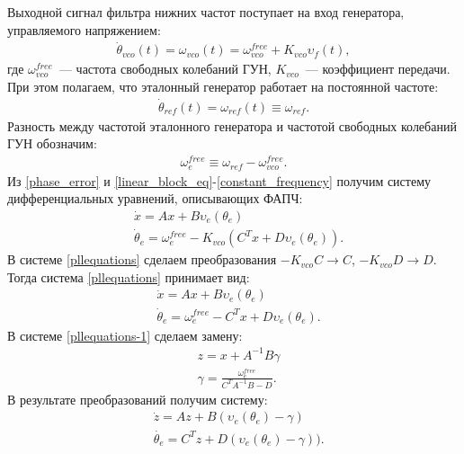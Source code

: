 \documentclass[a4paper,article,14pt]{extarticle}
\begin{document}
Выходной сигнал фильтра нижних частот поступает на вход генератора, управляемого напряжением:
 \begin{equation}\label{VCO_eq}
 \begin{aligned}
\dot{\theta}_{vco}(t) = \omega_{vco}(t) = \omega^{free}_{vco} + K_{vco}\upsilon_f(t),
 \end{aligned}
\end{equation}
где $\omega^{free}_{vco}$~--- частота свободных колебаний ГУН, $K_{vco}$~--- коэффициент передачи. При этом полагаем, что эталонный генератор работает на постоянной частоте:
 \begin{equation}
 \begin{aligned}
\dot{\theta}_{ref}(t) = \omega_{ref}(t) \equiv \omega_{ref}.
 \end{aligned}
\end{equation}
Разность между частотой эталонного генератора и частотой свободных колебаний ГУН обозначим:
 \begin{equation}\label{constant_frequency}
 \begin{aligned}
\omega_e^{free} \equiv \omega_{ref} - \omega^{free}_{vco}.
 \end{aligned}
\end{equation}
Из \eqref{phase_error} и \eqref{linear_block_eq}-\eqref{constant_frequency} получим систему дифференциальных уравнений, описывающих ФАПЧ:
 \begin{equation}\label{pllequations}
 \begin{aligned}
 &\dot{x} = Ax + B\upsilon_e(\theta_e)\\
 &\dot{\theta}_e = \omega_e^{free} - K_{vco}(C^Tx + D\upsilon_e(\theta_e)).
 \end{aligned}
\end{equation}
В системе \eqref{pllequations} сделаем преобразования $-K_{vco}C \rightarrow C$, $-K_{vco}D \rightarrow D$. Тогда система \eqref{pllequations} принимает вид:
 \begin{equation}\label{pllequations-1}
 \begin{aligned}
 &\dot{x} = Ax + B\upsilon_e(\theta_e)\\
 &\dot{\theta}_e = \omega_e^{free} - C^Tx + D\upsilon_e(\theta_e).
 \end{aligned}
\end{equation}
В системе \eqref{pllequations-1} сделаем замену:
 \begin{equation}
 \begin{aligned}
 &z = x + A^{-1}B\gamma \\
 &\gamma = \frac{\omega_e^{free}}{C^TA^{-1}B-D}.
 \end{aligned}
\end{equation}
В результате преобразований получим систему:
 \begin{equation}\label{system_pll}
 \begin{aligned}
 &\dot{z} = Az + B(\upsilon_e(\theta_e) - \gamma)\\
 &\dot{\theta_e} = C^Tz + D(\upsilon_e(\theta_e) - \gamma)).
 \end{aligned}
\end{equation}
\end{document}
